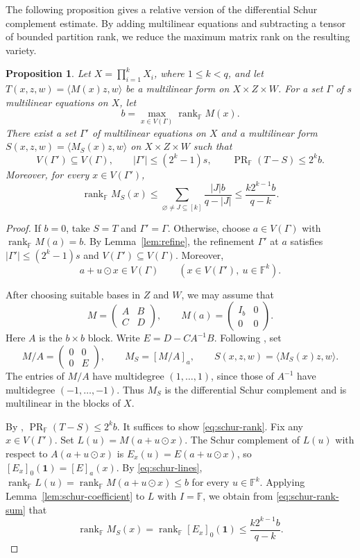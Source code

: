 \documentclass[11pt,reqno]{amsart}
\theoremstyle{plain}
\newtheorem{proposition}[theorem]{Proposition}
\theoremstyle{definition}
\newcommand{\F}{\mathbb F}
\DeclareMathOperator{\prank}{PR}
\DeclareMathOperator{\rk}{rank}
\begin{document}
The following proposition gives a relative version of the differential Schur complement estimate. By adding multilinear equations and subtracting a tensor of bounded partition rank, we reduce the maximum matrix rank on the resulting variety.
\begin{proposition}\label{prop:relativeschur}
Let \(X=\prod_{i=1}^{k}X_i\), where \(1\le k<q\), and let
\(T(x,z,w)=\langle M(x)z,w\rangle\) be a multilinear form on
\(X\times Z\times W\). For a set \(\Gamma\) of \(s\) multilinear
equations on $X$, let
\[
 b=\max_{x\in V(\Gamma)}\rk_{\F}M(x).
\]
There exist a set \(\Gamma'\) of multilinear equations on $X$ and a
multilinear form \(S(x,z,w)=\langle M_S(x)z,w\rangle\) on
\(X\times Z\times W\) such that
\[
 V(\Gamma')\subseteq V(\Gamma),\qquad
 |\Gamma'|\le (2^k-1)s,\qquad \prank_{\F}(T-S)\le 2^k b.
\]
Moreover, for every \(x\in V(\Gamma')\),
\begin{equation}\label{eq:schur-rank}
 \rk_{\F}M_S(x)
 \le \sum_{\varnothing\ne J\subseteq[k]}\frac{|J|b}{q-|J|}
 \le \frac{k2^{k-1}b}{q-k}.
\end{equation}
\end{proposition}
\begin{proof}
If $b=0$, take $S=T$ and $\Gamma'=\Gamma$. Otherwise, choose
$a\in V(\Gamma)$ with $\rk_{\F} M(a)=b$. By Lemma~\ref{lem:refine},
the refinement $\Gamma'$ at $a$ satisfies
$|\Gamma'|\leq(2^k-1)s$ and $V(\Gamma')\subseteq V(\Gamma)$. Moreover, \begin{equation}\label{eq:schur-lines}
 a+u\odot x\in V(\Gamma)\qquad(x\in V(\Gamma'),\ u\in\F^k).
\end{equation}

After choosing suitable bases in $Z$ and $W$, we may assume that
\[
 M=\begin{pmatrix}A&B\\ C&D\end{pmatrix},
 \qquad M(a)=\begin{pmatrix}I_b&0\\0&0\end{pmatrix}.
\]
Here $A$ is the $b\times b$ block. Write $E=D-CA^{-1}B$. Following \cite[Definition~4.3]{MZSchur}, set
\[
 M/A=\begin{pmatrix}0&0\\0&E\end{pmatrix},\qquad
 M_S=[M/A]_a,\qquad S(x,z,w)=\langle M_S(x)z,w\rangle.
\]
The entries of $M/A$ have multidegree $(1,\ldots,1)$, since those
of $A^{-1}$ have multidegree $(-1,\ldots,-1)$.
Thus $M_S$ is the differential Schur complement and is multilinear in the blocks of $X$.

By \cite[Proposition~4.4]{MZSchur}, $\prank_{\F}(T-S)\le 2^k b$. It suffices to show \eqref{eq:schur-rank}.
Fix any $x\in V(\Gamma')$. Set $L(u)=M(a+u\odot x)$.
The Schur complement of $L(u)$ with respect to $A(a+u\odot x)$ is
$E_x(u)=E(a+u\odot x)$, so $[E_x]_0(\mathbf 1)=[E]_a(x)$.
By \eqref{eq:schur-lines}, $\rk_{\F}L(u)=\rk_{\F}M(a+u\odot x)\leq b$ for every $u\in\F^k$. Applying Lemma~\ref{lem:schur-coefficient} to $L$ with $I=\F$, we obtain from \eqref{eq:schur-rank-sum} that
\[
 \rk_{\F} M_{S}(x)=\rk_{\F} [E_x]_0(\mathbf 1)
 \leq\frac{k2^{k-1}b}{q-k}.
\]
\end{proof}
\end{document}
